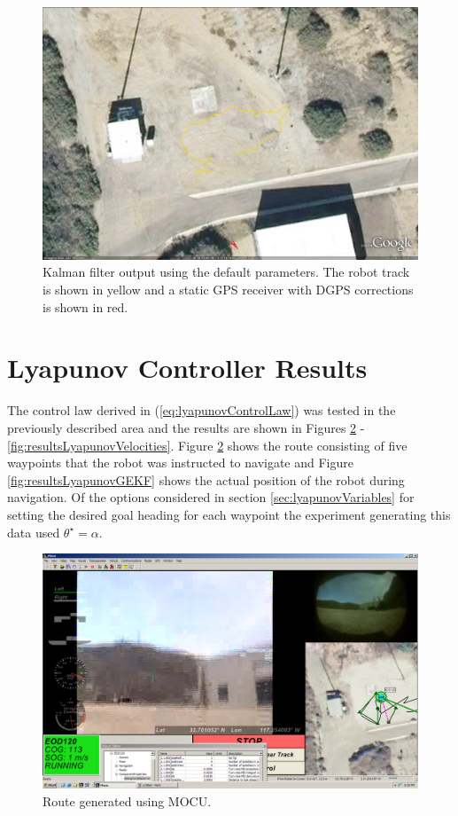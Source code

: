 \begin{figure}[ht!]
	\centering
	\includegraphics[width=.95\textwidth]{images/kfPlainDataFirstAttempt}
	\caption{Kalman filter output using the default parameters. The robot track is shown in yellow and a static GPS receiver with DGPS corrections is shown in red.}
	\label{fig:kfPlainDataFirstAttempt}
\end{figure}

\section{Lyapunov Controller Results}
\label{sec:lyapunovResults}
The control law derived in (\ref{eq:lyapunovControlLaw}) was tested in the previously described area and the results are shown in Figures \ref{fig:resultsLyapunovMocu} - \ref{fig:resultsLyapunovVelocities}. Figure \ref{fig:resultsLyapunovMocu} shows the route consisting of five waypoints that the robot was instructed to navigate and Figure \ref{fig:resultsLyapunovGEKF} shows the actual position of the robot during navigation. Of the options considered in section \ref{sec:lyapunovVariables} for setting the desired goal heading for each waypoint the experiment generating this data used $\theta^\star=\alpha$.

\begin{figure}[ht!]
	\centering
	\includegraphics[width=.5\textwidth]{images/20100918_1717_mocu}
	\caption{Route generated using MOCU.}
	\label{fig:resultsLyapunovMocu}
\end{figure}

